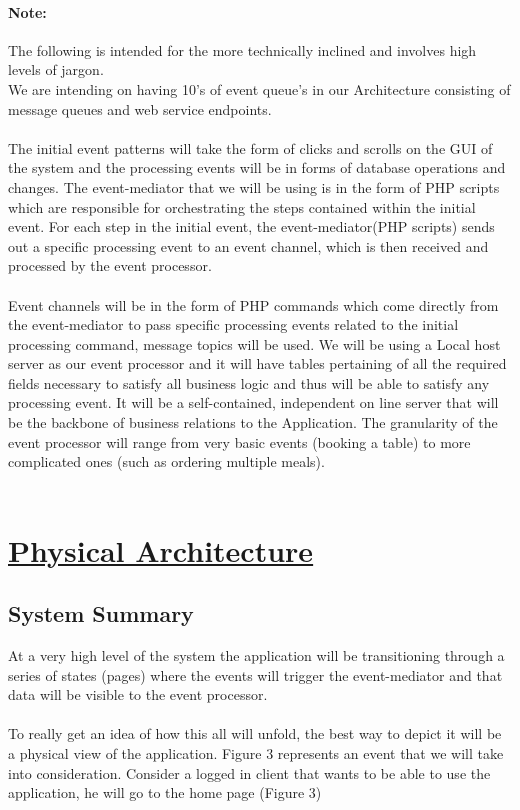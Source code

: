\documentclass{article}
\begin{document}
\paragraph*{Note:}
The following is intended for the more technically inclined and involves high levels of jargon.\\ We are intending on having 10's of event queue's in our Architecture consisting of message queues and web service endpoints.\\\\ The initial event patterns will take the form of clicks and scrolls on the GUI of the system and the processing events will be in forms of database operations and changes. The event-mediator that we will be using is in the form of PHP scripts which are responsible for orchestrating the steps contained within the initial event. For each step in the initial event, the event-mediator(PHP scripts) sends out a specific processing event to an event channel, which is then received and processed by the event processor.\\\\ Event channels will be in the form of PHP commands which come directly from the event-mediator to pass specific processing events related to the initial processing command, message topics will be used.
We will be using a Local host server as our event processor and it will have tables pertaining of all the required fields necessary to satisfy all business logic and thus will be able to satisfy any processing event. It will be a self-contained, independent on line server that will be the backbone of business relations to the Application. The granularity of the event processor will range from very basic events (booking a table) to more complicated ones (such as ordering multiple meals).\\\\

\pagebreak
\section{\underline{Physical Architecture}}
\subsection{{System Summary}}
At a very high level of the system the application will be transitioning through a series of states (pages) where the events will trigger the event-mediator and that data will be visible to the event processor.\\\\ To really get an idea of how this all will unfold, the best way to depict it will be a physical view of the application. Figure 3 represents an event that we will take into consideration. Consider a logged in client that wants to be able to use the application, he will go to the home page (Figure 3)\\\\\
\end{document}
